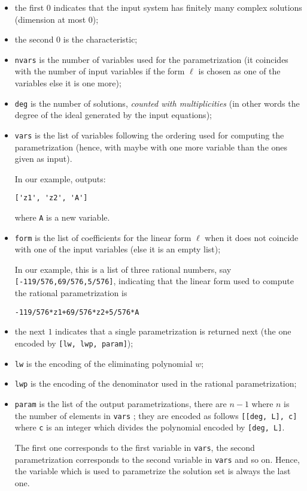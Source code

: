 \documentclass[a4paper,english,11pt]{scrartcl}
\theoremstyle{definition}
\theoremstyle{remark}
\begin{document}
\begin{itemize}
\item the first $0$ indicates that the input system has finitely
  many complex solutions (dimension at most $0$);
\item the second $0$ is the characteristic;
\item \verb+nvars+ is the number of variables used for the parametrization (it
  coincides with the number of input variables if the form $\ell$ is chosen
  as one of the variables else it is one more);
\item \verb+deg+ is the number of solutions, \emph{counted with multiplicities}
  (in other words the degree of the ideal generated by the input equations);
\item \verb+vars+ is the list of variables following the ordering used for
  computing the parametrization (hence, with maybe with one
  more variable than the ones given as input).

  In our example, \msolve outputs:
\begin{verbatim}
['z1', 'z2', 'A']
\end{verbatim}
where \verb+A+ is a new variable. 

\item \texttt{form} is the list of coefficients for the linear form $\ell$ when
  it does not coincide with one of the input variables (else it is an empty list);

  In our example, this is a list of three rational numbers,
  say \verb+[-119/576,69/576,5/576]+, 
  indicating that the linear form used to compute the rational parametrization is 
\begin{verbatim}
-119/576*z1+69/576*z2+5/576*A
\end{verbatim}
\item the next $1$ indicates that a single parametrization is returned next (the one encoded by \verb+[lw, lwp, param]+);
\item \verb+lw+ is the encoding of the eliminating polynomial $w$;
\item \verb+lwp+ is the encoding of the denominator used in the rational
  parametrization;
\item \verb+param+ is the list of the output parametrizations, there are $n-1$ where 
    $n$ is the number of elements in \verb+vars+ ; 
    they are encoded as follows \verb+[[deg, L], c]+ where \verb+c+ is 
    an integer which divides the polynomial encoded by \verb+[deg, L]+. 

    The first one corresponds to the first variable in \verb+vars+, the 
    second parametrization corresponds to the second variable in \verb+vars+ 
    and so on. Hence, the variable which is used to parametrize the solution 
    set is always the last one.
\end{itemize}
\end{document}
